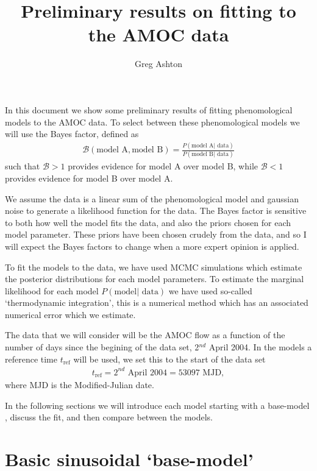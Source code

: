 \documentclass{article}
\newcommand{\tref}{t_{\textrm{ref}}}
\begin{document}

\title{Preliminary results on fitting to the AMOC data}
\author{Greg Ashton}
\date{}
\maketitle

In this document we show some preliminary results of fitting phenomological models
to the AMOC data. To select between these phenomological models we will use the
Bayes factor, defined as
\begin{align}
\mathcal{B}(\textrm{model A}, \textrm{model B}) = \frac{P(\textrm{model A}| \textrm{ data})}{P(\textrm{model B}| \textrm{ data})}
\label{eqn: Bayes}
\end{align}
such that $\mathcal{B} > 1$ provides evidence for model A over model B, while
$\mathcal{B} < 1$ provides evidence for model B over model A. 

We assume the data is a linear sum of the phenomological model and
gaussian noise to generate a likelihood function for the data. The Bayes factor
is sensitive to both how well the model fits the data, and also the priors chosen
for each model parameter. These priors have been chosen crudely from the data,
and so I will expect the Bayes factors to change when a more expert opinion is
applied.

To fit the models to the data, we have used MCMC simulations which estimate the
posterior distributions for each model parameters. To estimate the marginal
likelihood for each model $P(\textrm{model}| \textrm{ data})$ we have used
so-called `thermodynamic integration', this is a numerical method which has an
associated numerical error which we estimate.

The data that we will consider will be the AMOC flow as a function of the number
of days since the begining of the data set, 2$^{nd}$ April 2004. In the models a
reference time $\tref$ will be used, we set this to the start of the data set
\begin{align}
\tref = \textrm{2}^{nd}\textrm{ April 2004} = 53097 \textrm{ MJD},
\end{align}
where MJD is the Modified-Julian date.

In the following sections we will introduce each model starting with a
base-model , discuss the fit, and then compare between the models.

\section{Basic sinusoidal `base-model'}
\end{document}

